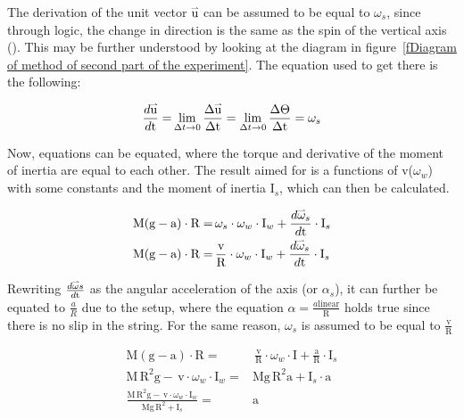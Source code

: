\documentclass{article}
\newcommand{\myvect}[1]{\accentset{\rightharpoonup}{#1}}
\begin{document}
The derivation of the unit vector $\myvect{\text{u}}$ can be assumed to be equal to $\omega_{s}$, since through logic, the change in direction is the same as the spin of the vertical axis (\cite{IBphysics}). This may be further understood by looking at the diagram in figure~\ref{fDiagram of method of second part of the experiment}. The equation used to get there is the following:

\begin{equation*}
\begin{aligned}
    \frac{d\myvect{\text{u}}}{d\text{t}}=& \lim_{\Delta t\to 0} \frac{\Delta\myvect{\text{u}}}{\Delta\text{t}}=\lim_{\Delta t\to 0} \frac{\Delta\Theta}{\Delta\text{t}}=\omega_{s}\\
\end{aligned}
\end{equation*}

Now, equations can be equated, where the torque and derivative of the moment of inertia are equal to each other. The result aimed for is a functions of v($\omega_w$) with some constants and the moment of inertia $\text{I}_s$, which can then be calculated.

\begin{equation*}
\begin{aligned}
    \text{M}(\text{g}-\text{a}) \cdot \text{R} =& \,\omega_{s}\cdot\omega_{w}\cdot\text{I}_w+\frac{d\myvect{\omega}_{s}}{d\text{t}}\cdot\text{I}_s\\
    \text{M}(\text{g}-\text{a}) \cdot \text{R} =& \,\frac{\text{v}}{\text{R}}\cdot\omega_{w}\cdot\text{I}_w+\frac{d\myvect{\omega}_{s}}{d\text{t}}\cdot\text{I}_s\\
\end{aligned}
\end{equation*}

Rewriting $\frac{d\myvect{\omega}{s}}{d\text{t}}$ as the angular acceleration of the axis (or $\alpha_s$), it can further be equated to $\frac{a}{R}$ due to the setup, where the equation $\alpha = \frac{a{\text{linear}}}{\text{R}}$ holds true since there is no slip in the string. For the same reason, $\omega_{s}$ is assumed to be equal to $\frac{\text{v}}{\text{R}}$

\begin{equation*}
\begin{aligned}
    \text{M}(\text{g}-\text{a}) \cdot \text{R} =& \,\frac{\text{v}}{\text{R}}\cdot\omega_{w}\cdot\text{I}+\frac{\text{a}}{\text{R}}\cdot\text{I}_s\\
    \text{M}\,\text{R}^2\text{g} - \,\text{v}\cdot\omega_{w}\cdot\text{I}_w =& \text{M}\text{g}\,\text{R}^2\text{a}+\text{I}_s\cdot\text{a}\\
    \frac{\text{M}\,\text{R}^2\text{g} - \,\text{v}\cdot\omega_{w}\cdot\text{I}_w}{\text{M}\text{g}\,\text{R}^2+\text{I}_s}=& \text{a}
\end{aligned}
\end{equation*}
\end{document}
